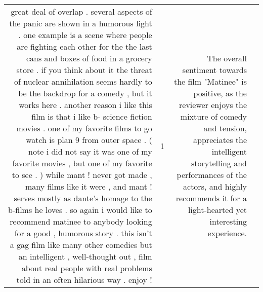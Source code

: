 \begin{tabular}{r{1cm} p{0.4in} r{1cm} p{0.4in}}
great deal of overlap .  several aspects of the panic are shown in a humorous light .  one example is a scene where people are fighting each other for the the last cans and boxes of food in a grocery store .  if you think about it the threat of nuclear annihilation seems hardly to be the backdrop for a comedy , but it works here .  another reason i like this film is that i like b- science fiction movies .  one of my favorite films to go watch is plan 9 from outer space .   ( note i did not say it was one of my favorite movies , but one of my favorite to see . )  while mant !  never got made , many films like it were , and mant !  serves mostly as dante's homage to the b-films he loves .  so again i would like to recommend matinee to anybody looking for a good , humorous story .  this isn't a gag film like many other comedies but an intelligent , well-thought out , film about real people with real problems told in an often hilarious way .  enjoy !   & 1 & The overall sentiment towards the film "Matinee" is positive, as the reviewer enjoys the mixture of comedy and tension, appreciates the intelligent storytelling and performances of the actors, and highly recommends it for a light-hearted yet interesting experience. \\

\end{tabular}

